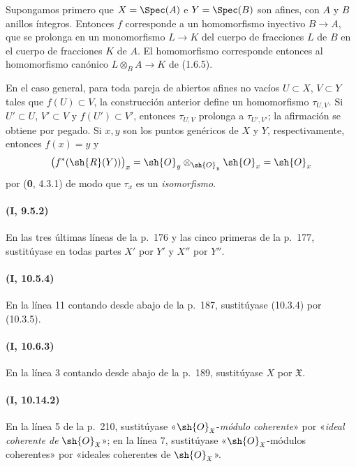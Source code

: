 Supongamos primero que $X=\Spec(A)$ e $Y=\Spec(B)$ son afines, con
$A$ y $B$ anillos íntegros. Entonces $f$ corresponde a un homomorfismo
inyectivo $B\to A$, que se prolonga en un monomorfismo $L\to K$ del
cuerpo de fracciones $L$ de $B$ en el cuerpo de fracciones $K$ de $A$.
El homomorfismo  corresponde entonces al homomorfismo
canónico
$L\otimes_B A\to K$
de (1.6.5).

En el caso general, para toda pareja de abiertos afines no vacíos
$U\subset X$, $V\subset Y$ tales que $f(U)\subset V$, la construcción
anterior define un homomorfismo $\tau_{U,V}$. Si $U'\subset U$,
$V'\subset V$ y $f(U')\subset V'$, entonces $\tau_{U,V}$ prolonga a
$\tau_{U',V'}$; la afirmación se obtiene por pegado. Si $x,y$ son los
puntos genéricos de $X$ y $Y$, respectivamente, entonces $f(x)=y$ y
\[
  \bigl(f^*(\sh{R}(Y))\bigr)_x
  =\sh{O}_y\otimes_{\sh{O}_y}\sh{O}_x
  =\sh{O}_x
\]
por (\textbf 0, 4.3.1) de modo que $\tau_x$ es un \emph{isomorfismo}.

\paragraph{(I, 9.5.2)}
En las tres últimas líneas de la p.~176 y las cinco primeras de la
p.~177, sustitúyase en todas partes $X'$ por $Y'$ y $X''$ por $Y''$.

\paragraph{(I, 10.5.4)}
En la línea 11 contando desde abajo de la p.~187, sustitúyase (10.3.4)
por (10.3.5).

\paragraph{(I, 10.6.3)}
En la línea 3 contando desde abajo de la p.~189, sustitúyase $X$ por
$\mathfrak X$.

\paragraph{(I, 10.14.2)}
En la línea 5 de la p.~210, sustitúyase «$\sh{O}_{\mathfrak X}$-\emph{módulo
coherente}» por «\emph{ideal coherente de} $\sh{O}_{\mathfrak X}$»; en la
línea 7, sustitúyase «$\sh{O}_{\mathfrak X}$-módulos coherentes» por
«ideales coherentes de $\sh{O}_{\mathfrak X}$».
